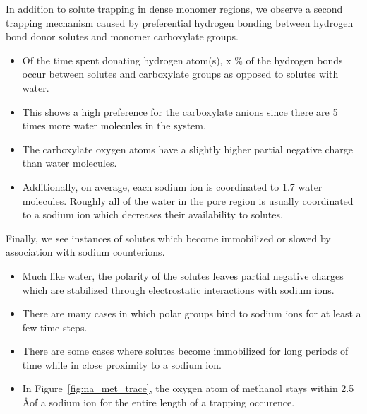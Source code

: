 \documentclass{article}
\begin{document}
  In addition to solute trapping in dense monomer regions, we observe a second
  trapping mechanism caused by preferential hydrogen bonding between 
  hydrogen bond donor solutes and monomer carboxylate groups. 
  \begin{itemize}
    \item Of the time spent donating hydrogen atom(s), x \% of the hydrogen
    bonds occur between solutes and carboxylate groups as opposed to solutes
    with water. 
    \item This shows a high preference for the carboxylate anions since there
    are 5 times more water molecules in the system.
    \item The carboxylate oxygen atoms have a slightly higher partial negative
    charge than water molecules.
    \item Additionally, on average, each sodium ion is coordinated to 1.7 water
    molecules. Roughly all of the water in the pore region is usually coordinated
    to a sodium ion which decreases their availability to solutes.
  \end{itemize}
  
  Finally, we see instances of solutes which become immobilized or slowed by 
  association with sodium counterions. 
  \begin{itemize}
    \item Much like water, the polarity of the solutes leaves partial negative
    charges which are stabilized through electrostatic interactions with sodium ions.
    \item There are many cases in which polar groups bind to sodium ions for at
    least a few time steps. 
    \item There are some cases where solutes become immobilized for long periods
    of time while in close proximity to a sodium ion.
    \item In Figure~\ref{fig:na_met_trace}, the oxygen atom of methanol stays
    within 2.5 \AA of a sodium ion for the entire length of a trapping occurence.
  \end{itemize}
  
\end{document}
